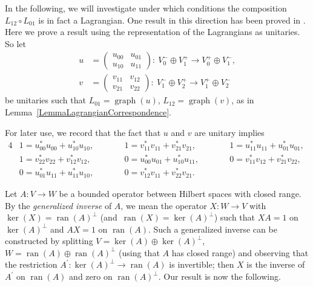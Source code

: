 \documentclass[10pt,a4paper]{amsart}
\numberwithin{equation}{section}
\DeclareMathOperator*{\ran}{ran}
\DeclareMathOperator{\graph}{\mathrm{graph}}
\begin{document}
In the following, we will investigate under which conditions the composition $L_{12} \circ L_{01}$ is in fact a Lagrangian.
One result in this direction has been proved in \cite[Section~2.2, Theorem~2.11]{LudewigRoos}.
Here we prove a result using the representation of the Lagrangians as unitaries.
So let
\begin{align}
 u &= \begin{pmatrix} u_{00} & u_{01} \\ u_{10} & u_{11} \end{pmatrix} \colon\ V_0^- \oplus V_1^+ \longrightarrow V_0^+ \oplus V_1^-,\nonumber \\
 v &= \begin{pmatrix} v_{11} & v_{12} \\ v_{21} & v_{22} \end{pmatrix}\colon\ V_1^- \oplus V_2^+ \longrightarrow V_1^+ \oplus V_2^- \label{MatrixRepUV}
\end{align}
 be unitaries such that $L_{01} = \graph(u)$, $L_{12} = \graph(v)$, as in Lemma~\ref{LemmaLagrangianCorrespondence}.

\begin{Remark}
For later use, we record that the fact that $u$ and $v$ are unitary implies
\begin{alignat}{4}
 & 1 = u_{00}^* u_{00} + u_{10}^* u_{10}, \qquad && 1 = v_{11}^* v_{11} + v_{21}^* v_{21}, \qquad&&
 1 = u_{11}^* u_{11} + u_{01}^* u_{01}, &\nonumber \\
& 1 = v_{22}^* v_{22} + v_{12}^* v_{12}, \qquad&&
 0 = u_{00}^* u_{01} + u_{10}^* u_{11}, \qquad&& 0 = v_{11}^* v_{12} + v_{21}^* v_{22},&\nonumber \\
& 0 = u_{01}^* u_{11} + u_{11}^* u_{10}, \qquad&& 0 = v_{12}^* v_{11} + v_{22}^* v_{21}.&&&\label{uvUnitary}
\end{alignat}
\end{Remark}

Let $A\colon V \to W$ be a bounded operator between Hilbert spaces with closed range.
By the \emph{generalized inverse} of $A$, we mean the operator $X \colon W \to V$ with $\ker(X) = \ran(A)^\perp$ (and~${\ran(X) = \ker(A)^\perp}$) such that $XA = 1$ on $\ker(A)^\perp$ and $AX = 1$ on $\ran(A)$.
Such a generalized inverse can be constructed by splitting $V = \ker(A) \oplus \ker(A)^\perp$, $W = \ran(A) \oplus \ran(A)^\perp$ (using that $A$ has closed range) and observing that the restriction $A^\prime\colon \ker(A)^\perp \to \ran(A)$ is invertible; then $X$ is the inverse of $A^\prime$ on $\ran(A)$ and zero on $\ran(A)^\perp$.
Our result is now the following.
\end{document}

